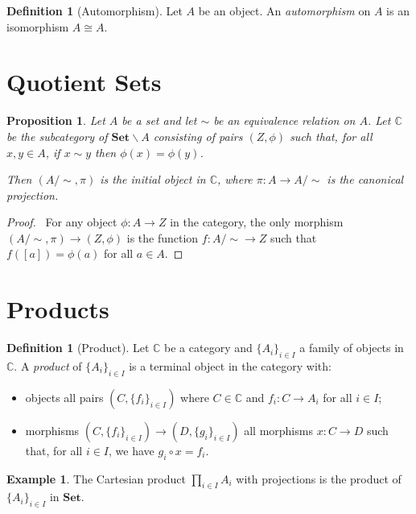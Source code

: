 \documentclass{article}
\let\qed\relax
\newtheorem{proposition}[axiom]{Proposition}
\theoremstyle{definition}
\newtheorem{definition}[axiom]{Definition}
\newtheorem{example}[axiom]{Example}
\begin{document}
\begin{definition}[Automorphism]
    Let $A$ be an object. An \emph{automorphism} on $A$ is an isomorphism $A \cong A$.
\end{definition}

\section{Quotient Sets}

\begin{proposition}
    Let $A$ be a set and let $\sim$ be an equivalence relation on $A$. Let $\mathbb{C}$
    be the subcategory of $\mathbf{Set} \backslash A$ consisting of pairs $(Z, \phi)$
    such that, for all $x,y \in A$, if $x \sim y$ then $\phi(x) = \phi(y)$.

    Then $(A/\sim, \pi)$ is the initial object in $\mathbb{C}$, where $\pi : A
    \rightarrow A / \sim$ is the canonical projection.
\end{proposition}

\begin{proof}
    \pf\ For any object $\phi : A \rightarrow Z$ in the category, the only morphism
    $(A/\sim, \pi) \rightarrow (Z, \phi)$ is the function $f : A/\sim \rightarrow Z$
    such that $f([a]) = \phi(a)$ for all $a \in A$. \qed
\end{proof}

\section{Products}

\begin{definition}[Product]
    Let $\mathbb{C}$ be a category and $\{ A_i \}_{i \in I}$ a family of objects in $\mathbb{C}$.
    A \emph{product} of $\{ A_i \}_{i \in I}$ is a terminal object in the category with:
    \begin{itemize}
        \item objects all pairs $(C,\{ f_i \}_{i \in I})$ where $C \in \mathbb{C}$
        and $f_i : C \rightarrow A_i$ for all $i \in I$;
        \item morphisms $(C,\{ f_i \}_{i \in I}) \rightarrow (D,\{ g_i \}_{i \in I})$ 
        all morphisms $x : C \rightarrow D$ such that, for all $i \in I$, we have $g_i \circ x = f_i$.
    \end{itemize}
\end{definition}

\begin{example}
    The Cartesian product $\prod_{i \in I} A_i$ with projections is the product of $\{ A_i \}_{i \in I}$ in $\mathbf{Set}$.
\end{example}
\end{document}
